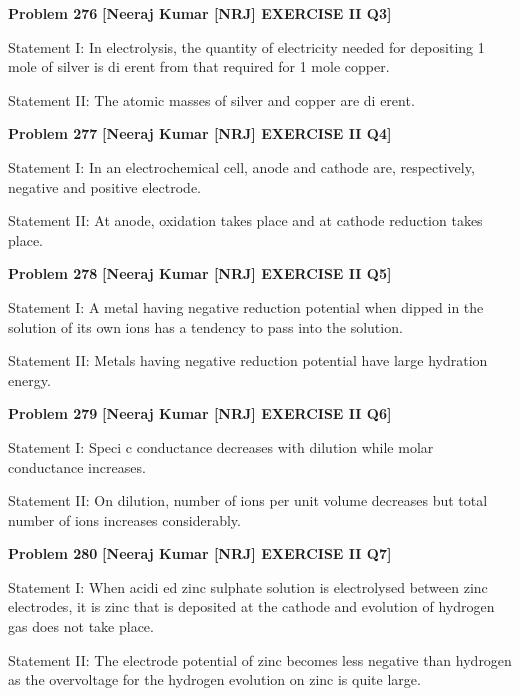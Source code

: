 \begin{problembox}
\textbf{Problem 276} \hfill \textbf{[Neeraj Kumar [NRJ] EXERCISE II Q3]}
\label{q:ext-nrj_all_questions-276}

Statement I: In electrolysis, the quantity of 
electricity needed for depositing 1 mole of silver is 
di  erent from that required for 1 mole copper.
 
 Statement II: The atomic masses of silver and 
copper are di  erent.
\end{problembox}

\begin{problembox}
\textbf{Problem 277} \hfill \textbf{[Neeraj Kumar [NRJ] EXERCISE II Q4]}
\label{q:ext-nrj_all_questions-277}

Statement I: In an electrochemical cell, anode and 
cathode are, respectively, negative and positive 
electrode.
 
 Statement II: At anode, oxidation takes place and 
at cathode reduction takes place.
\end{problembox}

\begin{problembox}
\textbf{Problem 278} \hfill \textbf{[Neeraj Kumar [NRJ] EXERCISE II Q5]}
\label{q:ext-nrj_all_questions-278}

Statement I: A metal having negative reduction 
potential when dipped in the solution of its own 
ions has a tendency to pass into the solution.
 
 Statement II: Metals having negative reduction 
potential have large hydration energy.
\end{problembox}

\begin{problembox}
\textbf{Problem 279} \hfill \textbf{[Neeraj Kumar [NRJ] EXERCISE II Q6]}
\label{q:ext-nrj_all_questions-279}

Statement I: Speci  c conductance decreases with 
dilution while molar conductance increases.
 
 Statement II: On dilution, number of ions per 
unit volume decreases but total number of ions 
increases considerably.
\end{problembox}

\begin{problembox}
\textbf{Problem 280} \hfill \textbf{[Neeraj Kumar [NRJ] EXERCISE II Q7]}
\label{q:ext-nrj_all_questions-280}

Statement I: When acidi  ed zinc sulphate solution 
is electrolysed between zinc electrodes, it is zinc 
that is deposited at the cathode and evolution of 
hydrogen gas does not take place.
 
 Statement II: The electrode potential of zinc 
becomes less negative than hydrogen as the 
overvoltage for the hydrogen evolution on zinc is 
quite large.
\end{problembox}

